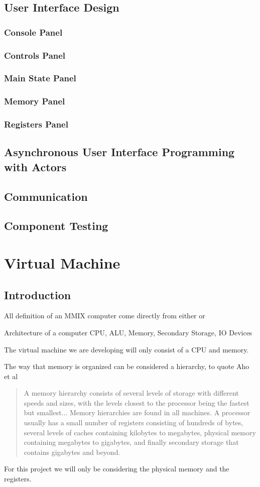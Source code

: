 \documentclass[a4paper,11pt]{report}
\begin{document}
\section{User Interface Design}
\subsection{Console Panel}
\subsection{Controls Panel}
\subsection{Main State Panel}
\subsection{Memory Panel}
\subsection{Registers Panel}
\section[Asynchronous UI Programming with Actors]{Asynchronous User Interface Programming with Actors}
\section{Communication}
\section{Component Testing}
\chapter{Virtual Machine}
\section{Introduction}
All definition of an MMIX computer come directly from either \cite{knuth:aocp1} or \cite{knuth:aocp2}

Architecture of a computer  %
CPU, ALU, Memory, Secondary Storage, IO Devices

The virtual machine we are developing will only consist of a CPU and memory.

The way that memory is organized can be considered a hierarchy, to quote Aho et al\cite{dragon}
\begin{quotation}
A memory hierarchy consists of several levels of storage with different speeds and sizes, with the levels closest to the processor being the fastest but smallest... Memory hierarchies are found in all machines. A processor usually has a small number of registers consisting of hundreds of bytes, several levels of caches containing kilobytes to megabytes, physical memory containing megabytes to gigabytes, and finally secondary storage that contains gigabytes and beyond.
\end{quotation}
For this project we will only be considering the physical memory and the registers.
\end{document}
